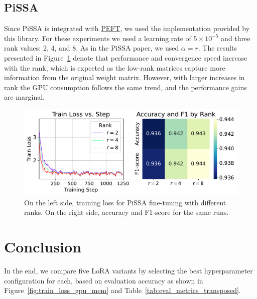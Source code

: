 \documentclass[a4paper,10pt,twocolumn,english]{article}
\begin{document}
\subsection{PiSSA}

Since PiSSA is integrated with \href{https://github.com/huggingface/peft}{PEFT}, we used the implementation provided by this library. For these experiments we used a learning rate of $5 \times 10^{-5}$ and three rank values: 2, 4, and 8. As in the PiSSA paper, we used $\alpha = r$. The results presented in Figure~\ref{fig:pissa} denote that performance and convergence speed increase with the rank, which is expected as the low-rank matrices capture more information from the original weight matrix. However, with larger increases in rank the GPU consumption follows the same trend, and the performance gains are marginal.

\begin{figure}[ht]
    \centering
    \includegraphics[width=1\linewidth]{../plots/pissa_train_loss_vs_step_final_v3.pdf}
    \caption{On the left side, training loss for PiSSA fine-tuning with different ranks. On the right side, accuracy and F1-score for the same runs.}
    \label{fig:pissa}
\end{figure}

\section{Conclusion}

In the end, we compare five LoRA variants by selecting the best hyperparameter configuration for each, based on evaluation accuracy as shown in Figure~\ref{fig:train_loss_gpu_mem} and Table~\ref{tab:eval_metrics_transposed}.
\end{document}
